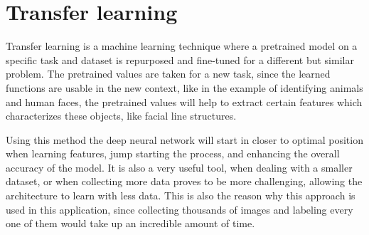 \section{Transfer learning}
\label{subsec:preformancesec2}

\par Transfer learning is a machine learning technique where a pretrained model on a specific task and dataset is repurposed and fine-tuned for a different but similar problem. The pretrained values are taken for a new task, since the learned functions are usable in the new context, like in the example of identifying animals and human faces, the pretrained values will help to extract certain features which characterizes these objects, like facial line structures.

\par Using this method the deep neural network will start in closer to optimal position when learning features, jump starting the process, and enhancing the overall accuracy of the model. It is also a very useful tool, when dealing with a smaller dataset, or when collecting more data proves to be more challenging, allowing the architecture to learn with less data. This is also the reason why this approach is used in this application, since collecting thousands of images and labeling every one of them would take up an incredible amount of time.